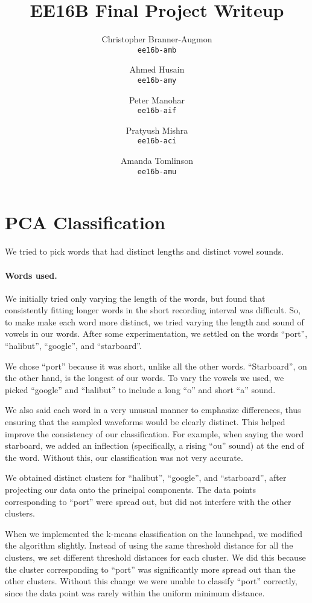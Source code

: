 \documentclass{article}
\title{\textsc{EE16B} Final Project Writeup}
\author{%
        Christopher Branner-Augmon \\
          \texttt{ee16b-amb}
        \and
        Ahmed Husain \\
          \texttt{ee16b-amy}
        \and
        Peter Manohar \\
          \texttt{ee16b-aif}
        \and
        Pratyush Mishra \\
        \texttt{ee16b-aci}
        \and
        Amanda Tomlinson\\
        \texttt{ee16b-amu}
      }
\begin{document}
\maketitle
\section*{PCA Classification}

We tried to pick words that had distinct lengths and distinct vowel sounds.

\paragraph{Words used.}
We initially tried only varying the length of the words, but found that
consistently fitting longer words in the short recording interval was difficult.
So, to make make each word more distinct, we tried varying the length and sound
of vowels in our words. After some experimentation, we settled on the words
``port'', ``halibut'', ``google'', and ``starboard''.

We chose ``port'' because it was short, unlike all the other words.
``Starboard'', on the other hand, is the longest of our words. To vary the
vowels we used, we picked ``google'' and ``halibut'' to include a long ``o''
and short ``a'' sound.

We also said each word in a very unusual manner to emphasize differences, thus
ensuring that the sampled waveforms would be clearly distinct.  This helped
improve the consistency of our classification. For example, when saying the
word starboard, we added an inflection (specifically, a rising ``ou'' sound) at
the end of the word. Without this, our classification was not very accurate.

We obtained distinct clusters for ``halibut'', ``google'', and ``starboard'',
after projecting our data onto the principal components.  The data points
corresponding to ``port'' were spread out, but did not interfere with the other
clusters.

When we implemented the k-means classification on the launchpad, we modified
the algorithm slightly. Instead of using the same threshold distance for all
the clusters, we set different threshold distances for each cluster. We did
this because the cluster corresponding to ``port'' was significantly more spread out
than the other clusters. Without this change we were unable to classify
``port'' correctly, since the data point was rarely within the uniform minimum
distance.
\end{document}
